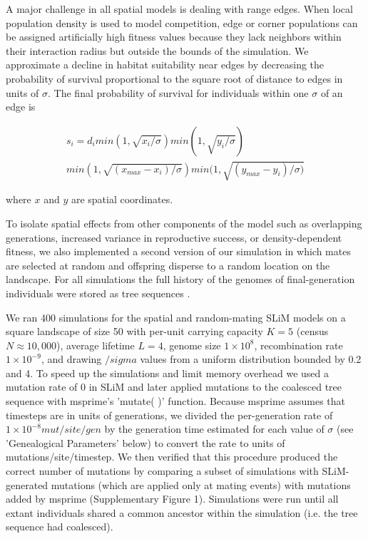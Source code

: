 \documentclass[9pt,twocolumn,twoside,lineno]{gsajnl}
\begin{document}
A major challenge in all spatial models is dealing with range edges. When local population density is used to model competition, edge or corner populations can be assigned artificially high fitness values because they lack neighbors within their interaction radius but outside the bounds of the simulation. We approximate a decline in habitat suitability near edges by decreasing the probability of survival proportional to the square root of distance to edges in units of $\sigma$. The final probability of survival for individuals within one $\sigma$ of an edge is 

\begin{multline}
    s_{i}=d_{i} min(1,\sqrt{x_{i}/\sigma})
    min(1,\sqrt{y_{i}/\sigma})\\
    min(1,\sqrt{(x_{max}-x_{i})/\sigma})
    min(1,\sqrt{(y_{max}-y_{i})/\sigma)}
\end{multline}

where $x$ and $y$ are spatial coordinates. 

To isolate spatial effects from other components of the model such as overlapping generations, increased variance in reproductive success, or density-dependent fitness, we  also implemented a second version of our simulation in which mates are selected at random and offspring disperse to a random location on the landscape. 
For all simulations the full history of the genomes of final-generation individuals were stored as tree sequences \citep{Kelleher2018}. 


We ran 400 simulations for the spatial and random-mating SLiM models on a square landscape of size 50 with per-unit carrying capacity $K=5$ (census $N \approx 10,000$), average lifetime $L=4$, genome size $1\times10^{8}$, recombination rate $1\times10^{-9}$, and drawing $/sigma$ values from a uniform distribution bounded by 0.2 and 4. To speed up the simulations and limit memory overhead we used a mutation rate of 0 in SLiM and later applied mutations to the coalesced tree sequence with msprime's 'mutate( )' function. Because msprime assumes that timesteps are in units of generations, we divided the per-generation rate of $1\times10^{-8} mut/site/gen$ by the generation time estimated for each value of $\sigma$ (see 'Genealogical Parameters' below) to convert the rate to units of mutations/site/timestep. We then verified that this procedure produced the correct number of mutations by comparing a subset of simulations with SLiM-generated mutations (which are applied only at mating events) with mutations added by msprime (Supplementary Figure 1). Simulations were run until all extant individuals shared a common ancestor within the simulation (i.e. the tree sequence had coalesced). 
\end{document}
